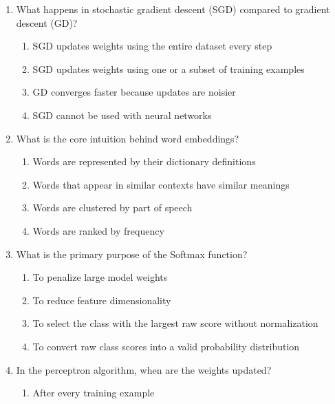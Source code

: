 \documentclass[12pt]{article}
\begin{document}
\begin{enumerate}[label=Q\arabic*.]
\begin{enumerate}[label=(\Alph*)]
    \item It improves cosine similarity
    \item It reduces dimensionality
    \item It avoids zero probabilities for unseen words
    \item It speeds up gradient descent
\end{enumerate}
\item What happens in stochastic gradient descent (SGD) compared to gradient descent (GD)?
\begin{enumerate}[label=(\Alph*)]
    \item SGD updates weights using the entire dataset every step
    \item SGD updates weights using one or a subset of training examples
    \item GD converges faster because updates are noisier
    \item SGD cannot be used with neural networks
\end{enumerate}
\item What is the core intuition behind word embeddings?
\begin{enumerate}[label=(\Alph*)]
    \item Words are represented by their dictionary definitions
    \item Words that appear in similar contexts have similar meanings
    \item Words are clustered by part of speech
    \item Words are ranked by frequency
\end{enumerate}
\item What is the primary purpose of the Softmax function?
\begin{enumerate}[label=(\Alph*)]
    \item To penalize large model weights
    \item To reduce feature dimensionality
    \item To select the class with the largest raw score without normalization
    \item To convert raw class scores into a valid probability distribution
\end{enumerate}
\item In the perceptron algorithm, when are the weights updated?
\begin{enumerate}[label=(\Alph*)]
    \item After every training example

\end{enumerate}
\end{enumerate}
\end{document}
